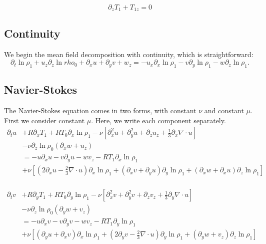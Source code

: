 \documentclass[letterpaper,12pt]{paper}
\newcommand{\lnrho}{\ensuremath{\ln \rho}}
\begin{document}
\begin{equation}
  \label{eq:aux_u}
  \partial_z T_1 + T_{1z} = 0
\end{equation}

\subsection{Continuity}
\label{sec:continuity_mfd}

We begin the mean field decomposition with continuity, which is straightforward:
\begin{equation}
  \label{eq:continuity_mfd}
  \partial_t \lnrho_1 + u_z \partial_z \ln rho_0 + \partial_x u
  + \partial_y v + w_z =
  - u_x \partial_x \lnrho_1   - v \partial_y \lnrho_1   - w \partial_z \lnrho_1.
\end{equation}

\subsection{Navier-Stokes}
\label{sec:ns_mfd}

The Navier-Stokes equation comes in two forms, with constant $\nu$ and
constant $\mu$. First we consider constant $\mu$. Here, we write each
component separately.
\begin{equation}
  \begin{aligned}
    \label{eq:ns_x_mfd}
    \partial_t u & + R \partial_x T_1 + R T_0 \partial_x \lnrho_1 - \nu
    \left[ \partial_x^2 u + \partial_y^2 u + \partial_z u_z +
      \frac{1}{3}\partial_x \nabla \cdot u \right] \\
& - \nu \partial_z \lnrho_0 \left(\partial_x w + u_z \right)  \\
    & = - u \partial_x u - v \partial_y u - w v_z - R T_1 \partial_x \lnrho_1 \\
    & + \nu \left[ \left( 2 \partial_x u - \frac{2}{3} \nabla \cdot
        u\right) \partial_x \lnrho_1 + (\partial_x v + \partial_y
      u)\partial_y \lnrho_1 + (\partial_x w + \partial_x u) \partial_z \lnrho_1 \right]\\
\end{aligned}
\end{equation}

\begin{equation}
  \begin{aligned}
    \label{eq:ns_y_mfd}
    \partial_t v & + R \partial_y T_1 + R T_0 \partial_y \lnrho_1 - \nu
    \left[ \partial_x^2 v + \partial_y^2 v + \partial_z v_z +
      \frac{1}{3} \partial_y \nabla \cdot u \right] \\
& - \nu \partial_z \lnrho_0 \left(\partial_y w + v_z \right)  \\
    & = - u \partial_x v - v \partial_y v - w v_z - R T_1 \partial_y \lnrho_1 \\
    & + \nu \left[ (\partial_y u + \partial_x
      v)\partial_x \lnrho_1 + \left( 2 \partial_y v - \frac{2}{3} \nabla \cdot
        u\right) \partial_y \lnrho_1 + (\partial_y w + v_z) \partial_z \lnrho_1 \right]\\
\end{aligned}
\end{equation}
\end{document}
